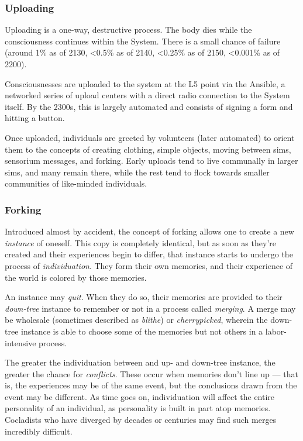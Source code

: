 \subsubsection{Uploading}

Uploading is a one-way, destructive process. The body dies while the consciousness continues within the System. There is a small chance of failure (around 1\% as of 2130, \textless0.5\% as of 2140, \textless0.25\% as of 2150, \textless0.001\% as of 2200).

Consciousnesses are uploaded to the system at the L5 point via the Ansible, a networked series of upload centers with a direct radio connection to the System itself. By the 2300s, this is largely automated and consists of signing a form and hitting a button.

Once uploaded, individuals are greeted by volunteers (later automated) to orient them to the concepts of creating clothing, simple objects, moving between sims, sensorium messages, and forking. Early uploads tend to live communally in larger sims, and many remain there, while the rest tend to flock towards smaller communities of like-minded individuals.

\subsubsection{Forking}

Introduced almost by accident, the concept of forking allows one to create a new \emph{instance} of oneself. This copy is completely identical, but as soon as they're created and their experiences begin to differ, that instance starts to undergo the process of \emph{individuation}. They form their own memories, and their experience of the world is colored by those memories.

An instance may \emph{quit}. When they do so, their memories are provided to their \emph{down-tree} instance to remember or not in a process called \emph{merging}. A merge may be wholesale (sometimes described as \emph{blithe}) or \emph{cherrypicked}, wherein the down-tree instance is able to choose some of the memories but not others in a labor-intensive process.

The greater the individuation between and up- and down-tree instance, the greater the chance for \emph{conflicts}. These occur when memories don't line up --- that is, the experiences may be of the same event, but the conclusions drawn from the event may be different. As time goes on, individuation will affect the entire personality of an individual, as personality is built in part atop memories. Cocladists who have diverged by decades or centuries may find such merges incredibly difficult.

